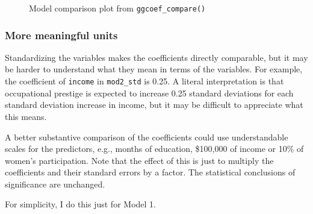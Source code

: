 \documentclass[
  letterpaper,
  10pt,
  krantz2]{krantz}
\begin{document}
\begin{figure}[H]


\caption{\label{fig-ggcoef-compare}Model comparison plot from
\texttt{ggcoef\_compare()}}

\end{figure}%

\subsubsection*{More meaningful units}\label{more-meaningful-units}

Standardizing the variables makes the coefficients directly comparable,
but it may be harder to understand what they mean in terms of the
variables. For example, the coefficient of \texttt{income} in
\texttt{mod2\_std} is 0.25. A literal interpretation is that
occupational prestige is expected to increase 0.25 standard deviations
for each standard deviation increase in income, but it may be difficult
to appreciate what this means.

A better substantive comparison of the coefficients could use
understandable scales for the predictors, e.g., months of education,
\$100,000 of income or 10\% of women's participation. Note that the
effect of this is just to multiply the coefficients and their standard
errors by a factor. The statistical conclusions of significance are
unchanged.

For simplicity, I do this just for Model 1.
\end{document}
